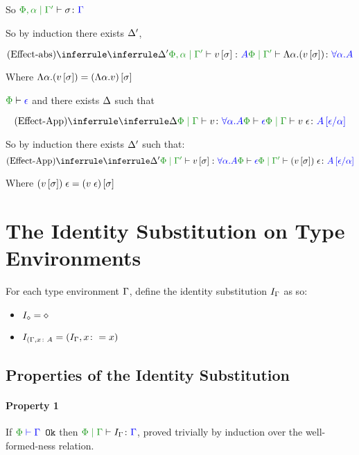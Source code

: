 {So $\etyperelation{\P,\a}{\G'}{\si}{\G}$

So by induction there exists $\Delta'$,

\begin{equation}
    \ntreeruleI{Effect-abs}{\treeruleI{\D'}{\etyperelation{\P,\a}{\G'}{v\ssi}{A}}}{\etyperelation{\P}{\G'}{\elam{\a}{(v\ssi)}}{\all{\a}{A}}}
\end{equation}

Where $\Lambda \alpha. (v\left[\sigma\right]) = (\Lambda \alpha. v)\left[\sigma\right]$


\bi $\wellformed{\P}{\e}$ and there exists $\Delta$ such that

\begin{equation}
    \ntreeruleII{Effect-App}{
        \treeruleI{\D}{\etyperelation{\P}{\G}{v}{\all{\a}{A}}}
    }{\wellformed{\P}{\e}}{
        \etyperelation{\P}{\G}{\eapp{v}{\e}
    }{A\ssub{\a}{\e}}}
\end{equation}

So by induction there exists $\Delta'$ such that:
\begin{equation}
    \ntreeruleII{Effect-App}{\treeruleI{\D'}{\etyperelation{\P}{\G'}{v\ssi}{\all{\a}{A}}}}{\wellformed{\P}{\e}}{\etyperelation{\P}{\G'}{\eapp{(v\ssi)}{\e}}{A\ssub{\a}{\e}}}
\end{equation}

Where $(v\left[\sigma\right])\;\epsilon = (v\;\epsilon)\left[\sigma\right]$

\section{The Identity Substitution on Type Environments}
For each type environment $\Gamma$, define the identity substitution $I_{\Gamma}$ as so:

\begin{itemize}
    \item $I_{\diamond} = \diamond$
    \item $I_{(\Gamma, x\colon A} = (I_{\Gamma}, x\colon= x)$
\end{itemize}

\subsection{Properties of the Identity Substitution}
\paragraph{Property 1}
If $\wellformedok{\P}{\G}$ then $\etyperelation{\P}{\G}{I_{\G}}{\G}$, proved trivially by induction over the well-formed-ness relation.

}
